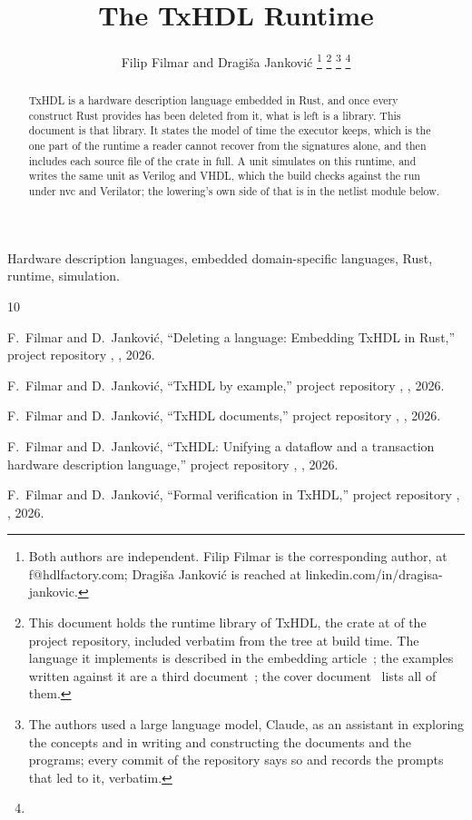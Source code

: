 \documentclass[journal,onecolumn,9pt]{IEEEtran}
\title{The TxHDL Runtime}
\author{Filip Filmar and Dragiša Janković%
\thanks{Both authors are independent. Filip Filmar is the
corresponding author, at f@hdlfactory.com; Dragiša Janković is
reached at linkedin.com/in/dragisa-jankovic.}%
\thanks{This document holds the runtime library of TxHDL, the crate
\code{txhdl} at \code{//lib} of the project repository, included
verbatim from the tree at build time. The language it implements is
described in the embedding article~\cite{embedding}; the examples
written against it are a third document~\cite{examples}; the cover
document~\cite{cover} lists all of them.}%
\thanks{The authors used a large language model, Claude, as an
assistant in exploring the concepts and in writing and constructing
the documents and the programs; every commit of the repository says
so and records the prompts that led to it, verbatim.}%
\thanks{\buildstamp}}
\begin{document}
\maketitle

\begin{abstract}
TxHDL is a hardware description language embedded in Rust, and once
every construct Rust provides has been deleted from it, what is left is
a library. This document is that library. It states the model of time
the executor keeps, which is the one part of the runtime a reader
cannot recover from the signatures alone, and then includes each source
file of the crate in full. A unit simulates on this runtime, and
\code{\#[lower]} writes the same unit as Verilog and VHDL, which the
build checks against the run under nvc and Verilator; the lowering's
own side of that is in the netlist module below.
\end{abstract}

\begin{IEEEkeywords}
Hardware description languages, embedded domain-specific languages, Rust,
runtime, simulation.
\end{IEEEkeywords}

{\footnotesize\tableofcontents}



\begin{thebibliography}{10}

F.~Filmar and D.~Janković, ``Deleting a language: Embedding TxHDL in
Rust,'' project repository , ,
2026.

F.~Filmar and D.~Janković, ``TxHDL by example,'' project repository
, , 2026.

F.~Filmar and D.~Janković, ``TxHDL documents,'' project repository
, , 2026.

F.~Filmar and D.~Janković, ``TxHDL: Unifying a dataflow and a transaction
hardware description language,'' project repository ,
, 2026.

F.~Filmar and D.~Janković, ``Formal verification in TxHDL,'' project
repository , , 2026.

\end{thebibliography}
\end{document}
